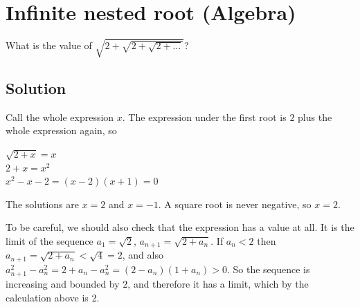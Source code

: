 \section {Infinite nested root (Algebra)}

What is the value of $\sqrt{2+\sqrt{2+\sqrt{2+\ldots}}}$?

\subsection{Solution}

Call the whole expression $x$. The expression under the first root is $2$ plus the whole expression again, so
\begin{center}
$\sqrt{2+x} = x$
\\
$2+x = x^2$
\\
$x^2 - x - 2 = (x-2)(x+1) = 0$
\end{center}
The solutions are $x=2$ and $x=-1$. A square root is never negative, so $x=2$.

To be careful, we should also check that the expression has a value at all.
It is the limit of the sequence $a_1 = \sqrt{2}$, $a_{n+1} = \sqrt{2+a_n}$.
If $a_n < 2$ then $a_{n+1} = \sqrt{2+a_n} < \sqrt{4} = 2$, and also $a_{n+1}^2 - a_n^2 = 2 + a_n - a_n^2 = (2-a_n)(1+a_n) > 0$.
So the sequence is increasing and bounded by $2$, and therefore it has a limit, which by the calculation above is $2$.
